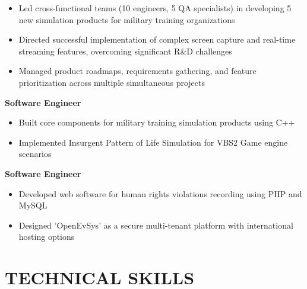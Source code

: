 \documentclass{fullstackdeveloper-ats}
\begin{document}
\begin{itemize}
    \item Led cross-functional teams (10 engineers, 5 QA specialists) in developing 5 new simulation products for military training organizations
    \item Directed successful implementation of complex screen capture and real-time streaming features, overcoming significant R\&D challenges
    \item Managed product roadmaps, requirements gathering, and feature prioritization across multiple simultaneous projects
\end{itemize}

\vspace{0.2cm}

\noindent\textbf{Software Engineer} \hfill {}\\

\begin{itemize}
    \item Built core components for military training simulation products using C++
    \item Implemented Insurgent Pattern of Life Simulation for VBS2 Game engine scenarios
\end{itemize}

\vspace{0.2cm}

\noindent\textbf{Software Engineer} \hfill {}\\

\begin{itemize}
    \item Developed web software for human rights violations recording using PHP and MySQL
    \item Designed 'OpenEvSys' as a secure multi-tenant platform with international hosting options
\end{itemize}

\section{TECHNICAL SKILLS}
\end{document}
